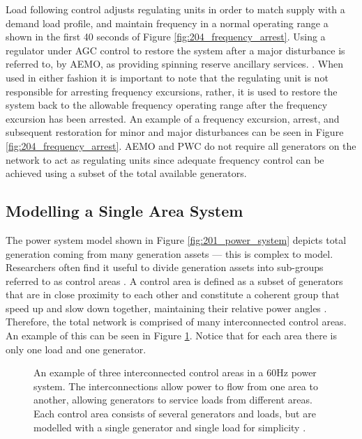 \newpage

Load following control adjusts regulating units in order to match supply with a demand load profile, and maintain frequency in a normal operating range a shown in the first 40 seconds of Figure \ref{fig:204_frequency_arrest}. Using a regulator under AGC control to restore the system after a major disturbance is referred to, by AEMO, as providing spinning reserve ancillary services. \cite{AEMOancilliaryserv}. When used in either fashion it is important to note that the regulating unit is not responsible for arresting frequency excursions, rather, it is used to restore the system back to the allowable frequency operating range after the frequency excursion has been arrested. An example of a frequency excursion, arrest, and subsequent restoration for minor and major disturbances can be seen in Figure \ref{fig:204_frequency_arrest}. AEMO and PWC do not require all generators on the network to act as regulating units since adequate frequency control can be achieved using a subset of the total available generators.


\subsection{Modelling a Single Area System}
The power system model shown in Figure \ref{fig:201_power_system} depicts total generation coming from many generation assets --- this is complex to model. Researchers often find it useful to divide generation assets into sub-groups referred to as control areas \cite{Kothari2011}. A control area is defined as a subset of generators that are in close proximity to each other and constitute a coherent group that speed up and slow down together, maintaining their relative power angles \cite{Kothari2011}. Therefore, the total network is comprised of many interconnected control areas. An example of this can be seen in Figure \ref{fig:2105_multiple_area_system}. Notice that for each area there is only one load and one generator.
\begin{figure}[ht]
	\centering
	\resizebox{12cm}{!}{}
	\caption[Multiple area power system]{An example of three interconnected control areas in a 60$\si{\hertz}$ power system. The interconnections allow power to flow from one area to another, allowing generators to service loads from different areas. Each control area consists of several generators and loads, but are modelled with a single generator and single load for simplicity \cite{Grainger1994}.}
	\label{fig:2105_multiple_area_system}
\end{figure}

